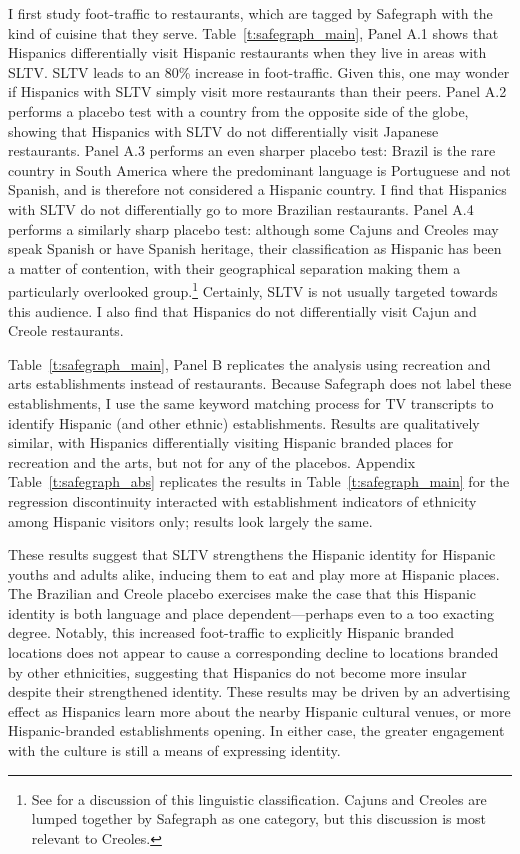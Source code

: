 \documentclass[11pt]{article}
\begin{document}
I first study foot-traffic to restaurants, which are tagged by Safegraph with the kind of cuisine that they serve. Table~\ref{t:safegraph_main}, Panel A.1 shows that Hispanics differentially visit Hispanic restaurants when they live in areas with SLTV. SLTV leads to an 80\% increase in foot-traffic. Given this, one may wonder if Hispanics with SLTV simply visit more restaurants than their peers. Panel A.2 performs a placebo test with a country from the opposite side of the globe, showing that Hispanics with SLTV do not differentially visit Japanese restaurants. Panel A.3 performs an even sharper placebo test: Brazil is the rare country in South America where the predominant language is Portuguese and not Spanish, and is therefore not considered a Hispanic country. I find that Hispanics with SLTV do not differentially go to more Brazilian restaurants. Panel A.4 performs a similarly sharp placebo test: although some Cajuns and Creoles may speak Spanish or have Spanish heritage, their classification as Hispanic has been a matter of contention, with their geographical separation making them a particularly overlooked group.\footnote{ See \cite{schwegler2010pidgin} for a discussion of this linguistic classification. Cajuns and Creoles are lumped together by Safegraph as one category, but this discussion is most relevant to Creoles.} Certainly, SLTV is not usually targeted towards this audience. I also find that Hispanics do not differentially visit Cajun and Creole restaurants. 

Table~\ref{t:safegraph_main}, Panel B replicates the analysis using recreation and arts establishments instead of restaurants. Because Safegraph does not label these establishments, I use the same keyword matching process for TV transcripts to identify Hispanic (and other ethnic) establishments. Results are qualitatively similar, with Hispanics differentially visiting Hispanic branded places for recreation and the arts, but not for any of the placebos. Appendix Table~\ref{t:safegraph_abs} replicates the results in Table~\ref{t:safegraph_main} for the regression discontinuity interacted with establishment indicators of ethnicity among Hispanic visitors only; results look largely the same. 

These results suggest that SLTV strengthens the Hispanic identity for Hispanic youths and adults alike, inducing them to eat and play more at Hispanic places. The Brazilian and Creole placebo exercises make the case that this Hispanic identity is both language and place dependent---perhaps even to a too exacting degree. Notably, this increased foot-traffic to explicitly Hispanic branded locations does not appear to cause a corresponding decline to locations branded by other ethnicities, suggesting that Hispanics do not become more insular despite their strengthened identity. These results may be driven by an advertising effect as Hispanics learn more about the nearby Hispanic cultural venues, or more Hispanic-branded establishments opening. In either case, the greater engagement with the culture is still a means of expressing identity. 
\end{document}
